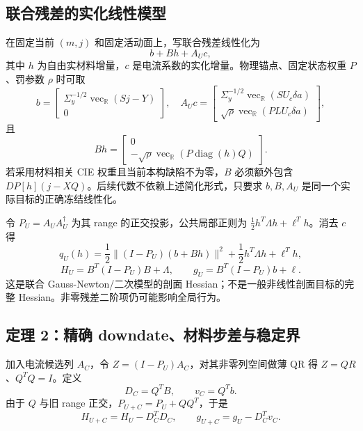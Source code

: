 \documentclass[10pt,a4paper]{article}
\begin{document}
\hypertarget{ux8054ux5408ux6b8bux5deeux7684ux5b9eux5316ux7ebfux6027ux6a21ux578b}{%
\subsection{联合残差的实化线性模型}\label{ux8054ux5408ux6b8bux5deeux7684ux5b9eux5316ux7ebfux6027ux6a21ux578b}}

在固定当前 \((m,j)\) 和固定活动面上，写联合残差线性化为 \[b+Bh+A_Uc,\]
其中 \(h\) 为自由实材料增量，\(c\)
是电流系数的实化增量。物理锚点、固定状态权重 \(P\)、罚参数 \(\rho\)
时可取
\[b=\begin{bmatrix}\Sigma_y^{-1/2}\operatorname{vec}_{\mathbb R}(Sj-Y)\\0\end{bmatrix},\quad
A_Uc=\begin{bmatrix}\Sigma_y^{-1/2}\operatorname{vec}_{\mathbb R}(S U_c\delta a)\\
\sqrt\rho\operatorname{vec}_{\mathbb R}(P L U_c\delta a)\end{bmatrix},\]
且
\[Bh=\begin{bmatrix}0\\-\sqrt\rho\operatorname{vec}_{\mathbb R}(P\operatorname{diag}(h)Q)\end{bmatrix}.\]
若采用材料相关 CIE 权重且当前本构缺陷不为零，\(B\) 必须额外包含
\(DP[h](j-XQ)\)。后续代数不依赖上述简化形式，只要求 \(b,B,A_U\)
是同一个实际目标的正确冻结线性化。

令 \(P_U=A_UA_U^\dagger\) 为其 range 的正交投影，公共局部正则为
\(\frac12h^T\Lambda h+\ell^Th\)。消去 \(c\) 得
\[q_U(h)=\frac12\|(I-P_U)(b+Bh)\|^2+\frac12h^T\Lambda h+\ell^Th,\]
\[H_U=B^T(I-P_U)B+\Lambda,\qquad g_U=B^T(I-P_U)b+\ell.\] 这是联合
Gauss-Newton/二次模型的剖面 Hessian；不是一般非线性剖面目标的完整
Hessian。非零残差二阶项仍可能影响全局行为。

\hypertarget{ux5b9aux7406-2ux7cbeux786e-downdateux6750ux6599ux6b65ux5deeux4e0eux7a33ux5b9aux754c}{%
\subsection{定理 2：精确
downdate、材料步差与稳定界}\label{ux5b9aux7406-2ux7cbeux786e-downdateux6750ux6599ux6b65ux5deeux4e0eux7a33ux5b9aux754c}}

加入电流候选列 \(A_C\)，令 \(Z=(I-P_U)A_C\)，对其非零列空间做薄 QR 得
\(Z=QR\)、\(Q^TQ=I\)。定义 \[D_C=Q^TB,\qquad v_C=Q^Tb.\] 由于 \(Q\) 与旧
range 正交，\(P_{U+C}=P_U+QQ^T\)，于是
\[\boxed{H_{U+C}=H_U-D_C^TD_C,\qquad
g_{U+C}=g_U-D_C^Tv_C.}\]
\end{document}
